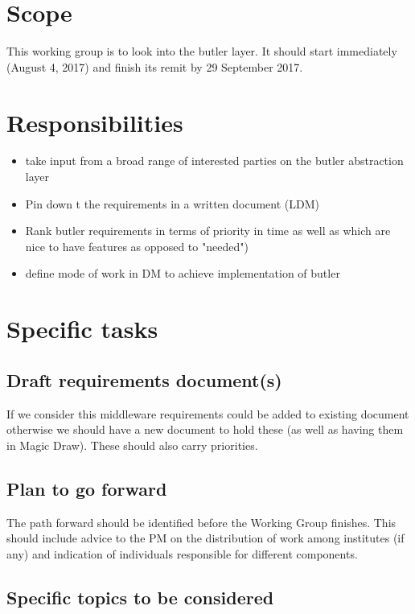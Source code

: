 \section{Scope}

This working group is to look into the butler layer. It should start immediately (August 4, 2017) and finish its remit by 29 September 2017.


\section{Responsibilities}
\begin{itemize}
 \item take input from a broad range of interested parties on the butler abstraction layer
\item Pin down t the requirements in a written document (LDM)
\item  Rank butler requirements in terms of priority in time as well as which are nice to have features as
opposed to "needed")
\item define mode of work in DM to achieve implementation of butler
\end{itemize}

\section{Specific tasks}

\subsection{ Draft requirements document(s)}
If we consider this middleware requirements could be added to existing document otherwise we should have a new document to hold these (as well as having them in Magic Draw). These should also carry priorities.

\subsection{Plan to go forward}
The path forward should be identified before the Working Group finishes. This should include advice to the PM on the distribution of work among institutes (if any) and indication of individuals responsible for different components.

\subsection{Specific topics to be considered}

